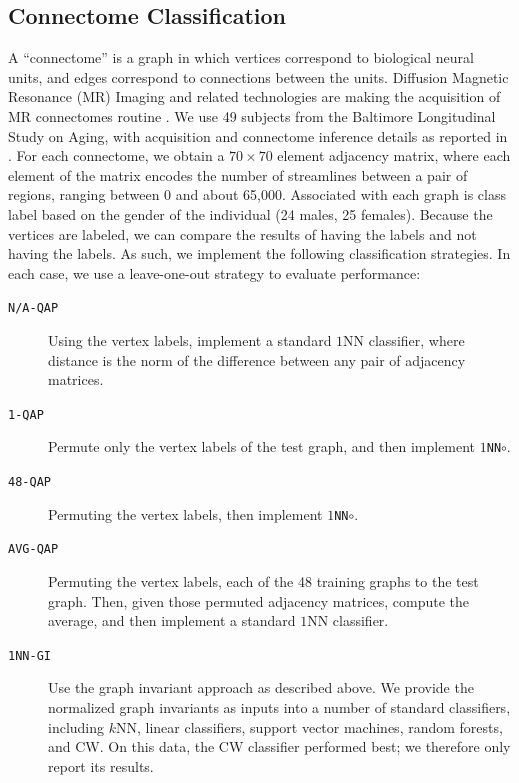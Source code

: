 \documentclass[10pt,journal,cspaper,compsoc]{IEEEtran}
\begin{document}




\subsection{Connectome Classification} %
\label{sub:connectome_classification}

A ``connectome'' is a graph in which vertices correspond to biological neural units, and edges correspond to connections between the units.  Diffusion Magnetic Resonance (MR) Imaging and related technologies are making the acquisition of MR connectomes routine \cite{Hagmann2010}.  We use 49 subjects from the Baltimore Longitudinal Study on Aging, with acquisition and connectome inference details as reported in \cite{OHBM10}.  For each connectome, we obtain a $70 \times 70$ element adjacency matrix, where each element of the matrix encodes the number of streamlines between a pair of regions, ranging between 0 and about 65,000.  Associated with each graph is class label based on the gender of the individual (24 males, 25 females).  Because the vertices are labeled, we can compare the results of having the labels and not having the labels.  As such, we implement the following classification strategies.  In each case, we use a leave-one-out strategy to evaluate performance:

\begin{description}
	\item[\texttt{N/A-QAP}] Using the vertex labels, implement a standard $1$NN classifier, where distance is the norm of the difference between any pair of adjacency matrices.
	\item[\texttt{1-QAP}] Permute only the vertex labels of the test graph, and then implement \texttt{$1$NN$\circ$\qapa}.
	\item[\texttt{48-QAP}] Permuting the vertex labels, then implement \texttt{$1$NN$\circ$\qapa}.
	\item[\texttt{AVG-QAP}] Permuting the vertex labels, \qapa each of the 48 training graphs to the test graph.  Then, given those permuted adjacency matrices, compute the average, and then implement a standard $1$NN classifier.
	\item[\texttt{1NN-GI}] Use the graph invariant approach as described above. We provide the normalized graph invariants as inputs into a number of standard classifiers, including $k$NN, linear classifiers, support vector machines, random forests, and CW. On this data, the CW classifier performed best; we therefore only report its results.
\end{description}
\end{document}
